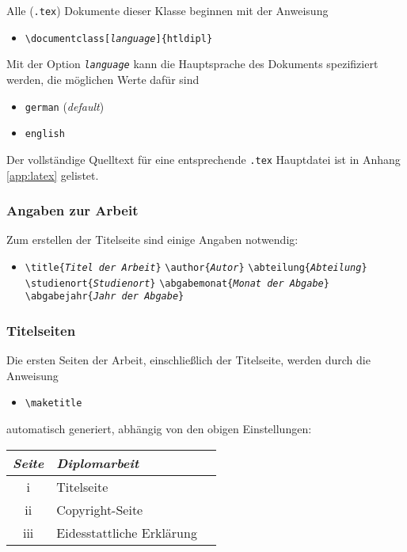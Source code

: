 Alle (\verb!.tex!) Dokumente dieser Klasse beginnen mit der Anweisung
%
\begin{itemize}
\item[] \verb!\documentclass[!\texttt{\emph{language}}\verb!]{htldipl}! 
\end{itemize}
%
Mit der Option \texttt{\emph{language}} kann die Hauptsprache des Dokuments spezifiziert werden, 
die möglichen Werte dafür sind
%
\begin{itemize}
\item[] \verb!german! (\emph{default})
\item[] \verb!english!
\end{itemize}
%
Der vollständige Quelltext für eine entsprechende \verb!.tex! Hauptdatei ist in Anhang \ref{app:latex} 
gelistet.


\subsubsection{Angaben zur Arbeit}

Zum erstellen der Titelseite sind einige Angaben notwendig:
%
\begin{itemize}
\item[] %
\verb!\title{!\texttt{\em Titel der Arbeit}\verb!}! \newline%
\verb!\author{!\texttt{\em Autor}\verb!}! \newline%
\verb!\abteilung{!\texttt{\em Abteilung}\verb!}! \newline%
\verb!\studienort{!\texttt{\em Studienort}\verb!}! \newline%
\verb!\abgabemonat{!\texttt{\em Monat der Abgabe}\verb!}! \newline%
\verb!\abgabejahr{!\texttt{\em Jahr der Abgabe}\verb!}!
\end{itemize}
%

\subsubsection{Titelseiten}

Die ersten Seiten der Arbeit, einschließlich der Titelseite,
werden durch die Anweisung
\begin{itemize}
\item[] %
\verb!\maketitle!  
\end{itemize}
automatisch generiert, abhängig von den obigen
Einstellungen:
%
\begin{center}
\begin{tabular}{cll}
\emph{Seite} & \emph{Diplomarbeit} \\
  \hline
  {\rm i} & Titelseite \\
  {\rm ii} & Copyright-Seite \\
  {\rm iii} & Eidesstattliche Erklärung \\
  \hline
\end{tabular}
\end{center}






